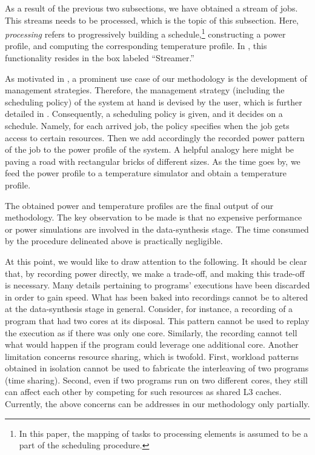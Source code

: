 As a result of the previous two subsections, we have obtained a stream of jobs.
This streams needs to be processed, which is the topic of this subsection. Here,
\emph{processing} refers to progressively building a schedule,\footnote{In this
paper, the mapping of tasks to processing elements is assumed to be a part of
the scheduling procedure.} constructing a power profile, and computing the
corresponding temperature profile. In , this functionality
resides in the box labeled ``Streamer.''

As motivated in , a prominent use case of our methodology is
the development of management strategies. Therefore, the management strategy
(including the scheduling policy) of the system at hand is devised by the user,
which is further detailed in . Consequently, a scheduling
policy is given, and it decides on a schedule. Namely, for each arrived job, the
policy specifies when the job gets access to certain resources. Then we add
accordingly the recorded power pattern of the job to the power profile of the
system. A helpful analogy here might be paving a road with rectangular bricks of
different sizes. As the time goes by, we feed the power profile to a temperature
simulator and obtain a temperature profile.

The obtained power and temperature profiles are the final output of our
methodology. The key observation to be made is that no expensive performance or
power simulations are involved in the data-synthesis stage. The time consumed by
the procedure delineated above is practically negligible.

At this point, we would like to draw attention to the following. It should be
clear that, by recording power directly, we make a trade-off, and making this
trade-off is necessary. Many details pertaining to programs' executions have
been discarded in order to gain speed. What has been baked into recordings
cannot be to altered at the data-synthesis stage in general. Consider, for
instance, a recording of a program that had two cores at its disposal. This
pattern cannot be used to replay the execution as if there was only one core.
Similarly, the recording cannot tell what would happen if the program could
leverage one additional core. Another limitation concerns resource sharing,
which is twofold. First, workload patterns obtained in isolation cannot be used
to fabricate the interleaving of two programs (time sharing). Second, even if
two programs run on two different cores, they still can affect each other by
competing for such resources as shared L3 caches. Currently, the above concerns
can be addresses in our methodology only partially.
